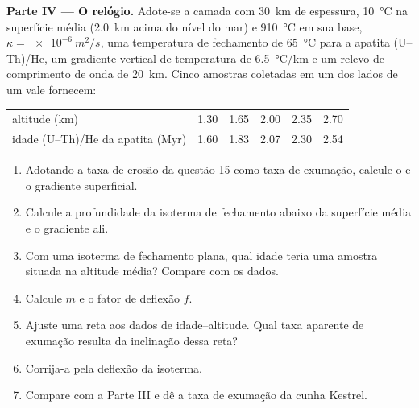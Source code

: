 \begin{problem}
\medskip\noindent\textbf{Parte IV --- O relógio.}
Adote-se a camada com \qty{30}{km} de espessura, \qty{10}{\celsius} na superfície média
(\qty{2.0}{km} acima do nível do mar) e \qty{910}{\celsius} em sua base, $\kappa
= \qty{e-6}{m^2/s}$, uma temperatura de fechamento de \qty{65}{\celsius} para a apatita
(U--Th)/He, um gradiente vertical de temperatura de \qty{6.5}{\celsius/km} e um relevo de
comprimento de onda de \qty{20}{km}. Cinco amostras coletadas em um dos lados de um vale fornecem:
\begin{center}
\small
\begin{tabular}{lccccc}
\hline
altitude (\unit{km}) & 1.30 & 1.65 & 2.00 & 2.35 & 2.70 \\
idade (U--Th)/He da apatita (\unit{Myr}) & 1.60 & 1.83 & 2.07 & 2.30 & 2.54 \\
\hline
\end{tabular}
\end{center}
\begin{enumerate}[resume]
  \item Adotando a taxa de erosão da questão 15 como taxa de exumação, calcule
        o  e o gradiente superficial.
  \item Calcule a profundidade da isoterma de fechamento abaixo da superfície média e
        o gradiente ali.
  \item Com uma isoterma de fechamento plana, qual idade teria uma amostra situada
        na altitude média? Compare com os dados.
  \item Calcule $m$ e o fator de deflexão $f$.
  \item Ajuste uma reta aos dados de idade--altitude. Qual taxa aparente de
        exumação resulta da inclinação dessa reta?
  \item Corrija-a pela deflexão da isoterma.
  \item Compare com a Parte III e dê a taxa de exumação da
        cunha Kestrel.
\end{enumerate}
\end{problem}
